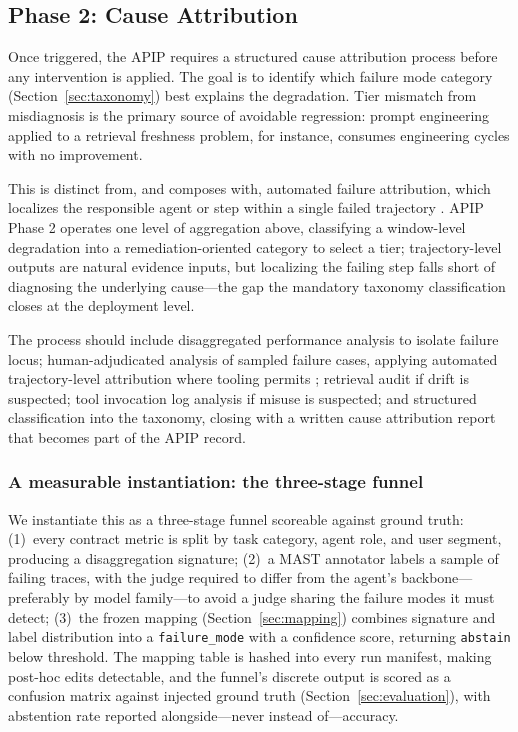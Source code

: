 \documentclass[conference]{IEEEtran}
\newcommand{\code}[1]{\texttt{\small #1}}
\begin{document}
\subsection{Phase 2: Cause Attribution}
\label{sec:attribution}

Once triggered, the APIP requires a structured cause attribution process before
any intervention is applied. The goal is to identify which failure mode category
(Section~\ref{sec:taxonomy}) best explains the degradation. Tier mismatch from
misdiagnosis is the primary source of avoidable regression: prompt engineering
applied to a retrieval freshness problem, for instance, consumes engineering
cycles with no improvement.

This is distinct from, and composes with, automated failure attribution, which
localizes the responsible agent or step within a single failed trajectory
\cite{ma2025attribution, zhang2025, agenttrace2026}. APIP Phase 2 operates one
level of aggregation above, classifying a window-level degradation into a
remediation-oriented category to select a tier; trajectory-level outputs are
natural evidence inputs, but localizing the failing step falls short of
diagnosing the underlying cause---the gap the mandatory taxonomy classification
closes at the deployment level.

The process should include disaggregated performance analysis to isolate
failure locus; human-adjudicated analysis of sampled failure cases, applying
automated trajectory-level attribution where tooling permits \cite{zhu2026,
ma2025attribution, agenttrace2026}; retrieval audit if drift is suspected; tool
invocation log analysis if misuse is suspected; and structured classification
into the taxonomy, closing with a written cause attribution report that becomes
part of the APIP record.

\subsubsection{A measurable instantiation: the three-stage funnel}
\label{sec:funnel}
We instantiate this as a three-stage funnel scoreable against ground truth:
(1)~every contract metric is split by task category, agent role, and user
segment, producing a disaggregation signature; (2)~a MAST annotator
\cite{cemri2025} labels a sample of failing traces, with the judge required to
differ from the agent's backbone---preferably by model family---to avoid a
judge sharing the failure modes it must detect; (3)~the frozen mapping
(Section~\ref{sec:mapping}) combines signature and label distribution into a
\code{failure\_mode} with a confidence score, returning \code{abstain} below
threshold. The mapping table is hashed into every run manifest, making post-hoc
edits detectable, and the funnel's discrete output is scored as a confusion
matrix against injected ground truth (Section~\ref{sec:evaluation}), with
abstention rate reported alongside---never instead of---accuracy.
\end{document}
